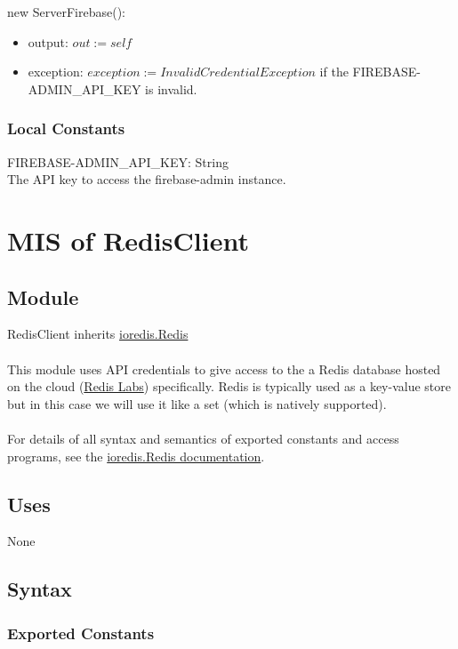 \documentclass[12pt, titlepage]{article}
\begin{document}
\noindent new ServerFirebase():
\begin{itemize} 
\item output: $out := self$ 
\item exception: $exception := InvalidCredentialException$ if the FIREBASE-ADMIN\_API\_KEY is invalid.  
\end{itemize} 

\subsubsection{Local Constants}

FIREBASE-ADMIN\_API\_KEY: String \\
The API key to access the firebase-admin instance.
  
\medskip
\newpage
\section{MIS of RedisClient} \label{RedisClient} 

\subsection{Module}

RedisClient inherits \href{https://luin.github.io/ioredis/classes/Redis.html}{ioredis.Redis} \\ \\
This module uses API credentials to give access to the a Redis database hosted on the cloud (\href{https://app.redislabs.com/#/}{Redis Labs}) specifically. Redis is typically used as a key-value store but in this case we will use it like a set (which is natively supported). 
\\
\\For details of all syntax and semantics of exported constants and access programs, see the \href{https://luin.github.io/ioredis/classes/Redis.html}{ioredis.Redis documentation}. 
\subsection{Uses}

None

\subsection{Syntax}

\subsubsection{Exported Constants}
\end{document}
